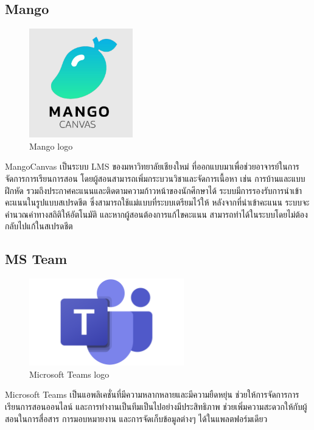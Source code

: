   \subsection{Mango}
    \begin{figure}[!h]
      \centering
      \includegraphics[width=0.4\textwidth]{image/Background/Mango-cmu.png}
      \caption[Mango]{Mango logo}
      \label{fig:mango_pic}
    \end{figure}
    \FloatBarrier
    \qquad MangoCanvas เป็นระบบ LMS ของมหาวิทยาลัยเชียงใหม่ ที่ออกแบบมาเพื่อช่วยอาจารย์ในการจัดการการเรียนการสอน โดยผู้สอนสามารถเพิ่มกระบวนวิชาและจัดการเนื้อหา เช่น การบ้านและแบบฝึกหัด รวมถึงประกาศคะแนนและติดตามความก้าวหน้าของนักศึกษาได้ ระบบมีการรองรับการนำเข้าคะแนนในรูปแบบสเปรดชีต ซึ่งสามารถใช้แม่แบบที่ระบบเตรียมไว้ให้ หลังจากที่นำเข้าคะแนน ระบบจะคำนวณค่าทางสถิติให้อัตโนมัติ และหากผู้สอนต้องการแก้ไขคะแนน สามารถทำได้ในระบบโดยไม่ต้องกลับไปแก้ในสเปรดชีต
  \subsection{MS Team}
    \begin{figure}[!h]
      \centering
      \includegraphics[width=0.6\textwidth]{image/Background/Microsoft-Teams-Logo.png}
      \caption[Microsoft Teams]{Microsoft Teams logo}
      \label{fig:microsoft_teams_pic}
    \end{figure}
    \FloatBarrier
    \qquad Microsoft Teams เป็นแอพลิเคชั่นที่มีความหลากหลายและมีความยืดหยุ่น ช่วยให้การจัดการการเรียนการสอนออนไลน์ และการทำงานเป็นทีมเป็นไปอย่างมีประสิทธิภาพ ช่วยเพิ่มความสะดวกให้กับผู้สอนในการสื่อสาร การมอบหมายงาน และการจัดเก็บข้อมูลต่างๆ ได้ในแพลตฟอร์มเดียว

